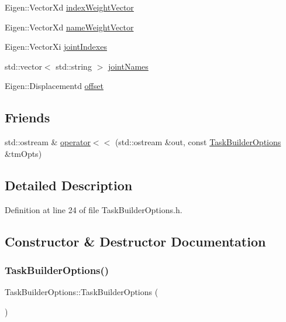 \begin{DoxyCompactItemize}
\item 
Eigen\+::\+Vector\+Xd \hyperlink{classocra_1_1TaskBuilderOptions_a04ebfb8955859ffc40087d3e7b53e0d2}{index\+Weight\+Vector}
\item 
Eigen\+::\+Vector\+Xd \hyperlink{classocra_1_1TaskBuilderOptions_a82a7eaa6cb0887e59c99cc4f97d2c818}{name\+Weight\+Vector}
\item 
Eigen\+::\+Vector\+Xi \hyperlink{classocra_1_1TaskBuilderOptions_ad5c32b5777c20dc348b80959574d4a37}{joint\+Indexes}
\item 
std\+::vector$<$ std\+::string $>$ \hyperlink{classocra_1_1TaskBuilderOptions_ab72b4855028ef6965107294b16818ad2}{joint\+Names}
\item 
Eigen\+::\+Displacementd \hyperlink{classocra_1_1TaskBuilderOptions_a6c632afc050c25f7bb5631fbe7741c93}{offset}
\end{DoxyCompactItemize}
\subsection*{Friends}
\begin{DoxyCompactItemize}
\item 
std\+::ostream \& \hyperlink{classocra_1_1TaskBuilderOptions_a414b60ce008b85fc9ec6fac4e9f6f8d7}{operator$<$$<$} (std\+::ostream \&out, const \hyperlink{classocra_1_1TaskBuilderOptions}{Task\+Builder\+Options} \&tm\+Opts)
\end{DoxyCompactItemize}


\subsection{Detailed Description}


Definition at line 24 of file Task\+Builder\+Options.\+h.



\subsection{Constructor \& Destructor Documentation}
\hypertarget{classocra_1_1TaskBuilderOptions_a99045de3fc12a569cb9a2bf6b60bbc34}{}\label{classocra_1_1TaskBuilderOptions_a99045de3fc12a569cb9a2bf6b60bbc34} 
\subsubsection{\texorpdfstring{Task\+Builder\+Options()}{TaskBuilderOptions()}}
{\footnotesize\ttfamily Task\+Builder\+Options\+::\+Task\+Builder\+Options (\begin{DoxyParamCaption}{ }\end{DoxyParamCaption})}



